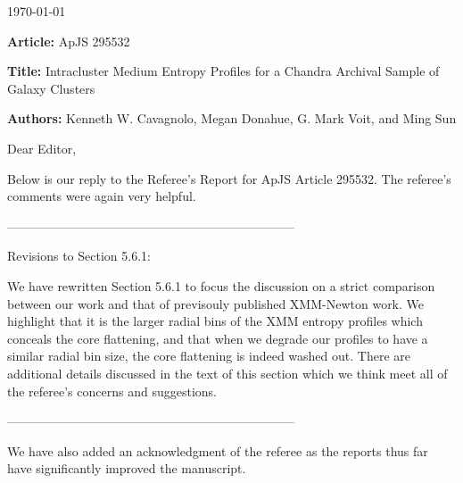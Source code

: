 \documentclass[11pt]{article}
\begin{document}
\today

{\bf{Article:}} ApJS 295532

{\bf{Title:}} Intracluster Medium Entropy Profiles for a Chandra Archival
Sample of Galaxy Clusters

{\bf{Authors:}} Kenneth W. Cavagnolo, Megan Donahue, G. Mark Voit, and Ming
Sun

Dear Editor,

Below is our reply to the Referee's Report for ApJS Article
295532. The referee's comments were again very helpful.

---------------------------------------------------------------------

Revisions to Section 5.6.1:

We have rewritten Section 5.6.1 to focus the discussion on a strict
comparison between our work and that of previsouly published
XMM-Newton work. We highlight that it is the larger radial bins of the
XMM entropy profiles which conceals the core flattening, and that when
we degrade our profiles to have a similar radial bin size, the core
flattening is indeed washed out. There are additional details
discussed in the text of this section which we think meet all of the
referee's concerns and suggestions.

---------------------------------------------------------------------

We have also added an acknowledgment of the referee as the reports
thus far have significantly improved the manuscript.
\end{document}
